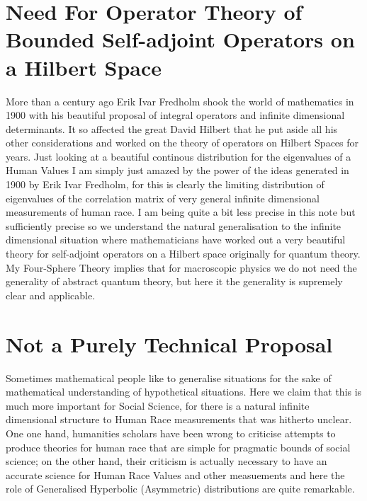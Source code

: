 \documentclass{amsart}
\begin{document}
\section{Need For Operator Theory of Bounded Self-adjoint Operators on a Hilbert Space}

More than a century ago Erik Ivar Fredholm shook the world of mathematics in 1900 with his beautiful proposal of integral operators and infinite dimensional determinants.  It so affected the great David Hilbert that he put aside all his other considerations and worked on the theory of operators on Hilbert Spaces for years.  Just looking at a beautiful continous distribution for the eigenvalues of a Human Values I am simply just amazed by the power of the ideas generated in 1900 by Erik Ivar Fredholm, for this is clearly the limiting distribution of eigenvalues of the correlation matrix of very general infinite dimensional measurements of human race.  I am being quite a bit less precise in this note but sufficiently precise so we understand the natural generalisation to the infinite dimensional situation where mathematicians have worked out a very beautiful theory for self-adjoint operators on a Hilbert space originally for quantum theory.  My Four-Sphere Theory implies that for macroscopic physics we do not need the generality of abstract quantum theory, but here it the generality is supremely clear and applicable.  

\section{Not a Purely Technical Proposal}
Sometimes mathematical people like to generalise situations for the sake of mathematical understanding of hypothetical situations.  Here we claim that this is much more important for Social Science, for there is a natural infinite dimensional structure to Human Race measurements that was hitherto unclear.  One one hand, humanities scholars have been wrong to criticise attempts to produce theories for human race that are simple for pragmatic bounds of social science; on the other hand, their criticism is actually necessary to have an accurate science for Human Race Values and other measuements and here the role of Generalised Hyperbolic (Asymmetric) distributions are quite remarkable.
\end{document}

